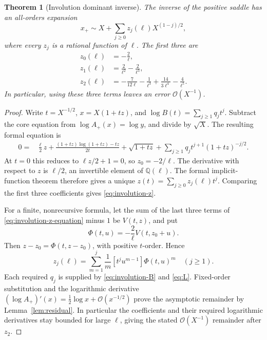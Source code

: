 \documentclass[11pt,a4paper]{article}
\numberwithin{equation}{section}
\newtheorem{theorem}{Theorem}[section]
\theoremstyle{definition}
\theoremstyle{remark}
\newcommand{\bigO}{\mathcal O}
\begin{document}
\begin{theorem}[Involution dominant inverse]
\label{thm:involution-inverse}
The inverse of the positive saddle has an all-orders expansion
\begin{equation}
 x_+\sim X+\sum_{j\ge0}z_j(\ell)X^{(1-j)/2},
 \label{eq:involution-inverse-general}
\end{equation}
where every $z_j$ is a rational function of $\ell$. The first three are
\begin{align}
 z_0(\ell)&=-\frac2\ell,\nonumber\\
 z_1(\ell)&=\frac2{\ell^2}-\frac2{\ell^3},\nonumber\\
 z_2(\ell)&=-\frac7{12\ell}-\frac1{\ell^3}
                +\frac{14}{3\ell^4}-\frac4{\ell^5}.
 \label{eq:involution-z}
\end{align}
In particular, using these three terms leaves an error $\bigO(X^{-1})$.
\end{theorem}
\begin{proof}
Write $t=X^{-1/2}$, $x=X(1+tz)$, and $\log B(t)=\sum_{j\ge1}q_jt^j$. Subtract the core equation from $\log A_+(x)=\log y$, and divide by $\sqrt X$. The resulting formal equation is
\begin{align}
 0={}&\frac\ell2z+
 \frac{(1+tz)\log(1+tz)-tz}{2t}
 +\sqrt{1+tz}
 +\sum_{j\ge1}q_jt^{j+1}(1+tz)^{-j/2}.
 \label{eq:involution-z-equation}
\end{align}
At $t=0$ this reduces to $\ell z/2+1=0$, so $z_0=-2/\ell$. The derivative with respect to $z$ is $\ell/2$, an invertible element of $\mathbb Q(\ell)$. The formal implicit-function theorem therefore gives a unique $z(t)=\sum_{j\ge0}z_j(\ell)t^j$. Comparing the first three coefficients gives \eqref{eq:involution-z}.

For a finite, nonrecursive formula, let the sum of the last three terms of \eqref{eq:involution-z-equation} minus $1$ be $V(t,z)$, and put
\[
 \Phi(t,u)=-\frac2\ell V(t,z_0+u).
\]
Then $z-z_0=\Phi(t,z-z_0)$, with positive $t$-order. Hence
\begin{equation}
 z_j(\ell)=\sum_{m=1}^{j}\frac1m[t^ju^{m-1}]\Phi(t,u)^m
 \quad(j\ge1).
 \label{eq:involution-z-finite}
\end{equation}
Each required $q_j$ is supplied by \eqref{eq:involution-B} and \eqref{eq:L}. Fixed-order substitution and the logarithmic derivative
$(\log A_+)'(x)=\tfrac12\log x+\bigO(x^{-1/2})$
prove the asymptotic remainder by Lemma~\ref{lem:residual}. In particular the coefficients and their required logarithmic derivatives stay bounded for large $\ell$, giving the stated $\bigO(X^{-1})$ remainder after $z_2$.
\end{proof}
\end{document}
